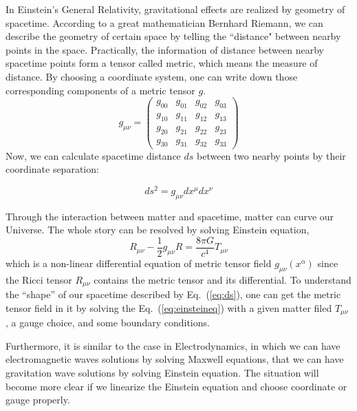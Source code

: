 In Einstein's General Relativity, gravitational effects are realized by geometry of spacetime. According to a great mathematician Bernhard Riemann, we can describe the geometry of certain space by telling the ``distance" between nearby points in the space. Practically, the information of distance between nearby spacetime points form a tensor called metric, which means the measure of distance. By choosing a coordinate system, one can write down those corresponding components of a metric tensor $g$.
\begin{equation}
    g_{\mu\nu}=
\left(
\begin{array}{cccc}
  g_{00} & g_{01} & g_{02} & g_{03} \\
  g_{10} & g_{11} & g_{12} & g_{13} \\
  g_{20} & g_{21} & g_{22} & g_{23} \\
  g_{30} & g_{31} & g_{32} & g_{33}
\end{array}
\right)  
\end{equation}
 Now, we can calculate spacetime distance $ds$ between two nearby points by their coordinate separation:

\begin{equation}
\label{eq:ds}
    ds^2 = g_{\mu\nu} dx^{\mu} dx^{\nu}
\end{equation}



%

Through the interaction between matter and spacetime, matter can curve our Universe. The whole story can be resolved by solving Einstein equation,
\begin{equation}
\label{eq:einsteineq}
    R_{\mu\nu}-\frac{1}{2}g_{\mu\nu}R = \frac{8 \pi G}{c^4} T_{\mu\nu}
\end{equation}
which is a non-linear differential equation of metric tensor field $g_{\mu\nu}(x^{\alpha})$ since the Ricci tensor $R_{\mu\nu}$ contains the metric tensor and its differential. To understand the ``shape'' of our spacetime described by Eq.~(\ref{eq:ds}), one can get the metric tensor field in it by solving the Eq.~(\ref{eq:einsteineq}) with a given matter filed $T_{\mu\nu}$ , a gauge choice, and some boundary conditions. 

Furthermore, it is similar to the case in Electrodynamics, in which we can have electromagnetic waves solutions by solving Maxwell equations, that we can have gravitation wave solutions by solving Einstein equation. The situation will become more clear if we linearize the Einstein equation and choose coordinate or gauge properly.

